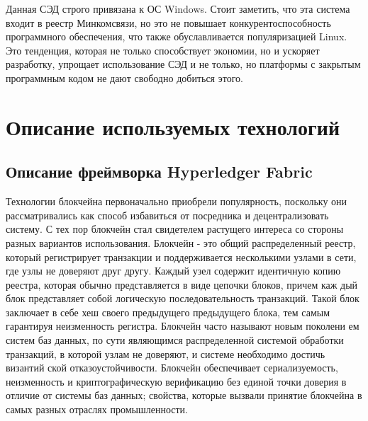 Данная СЭД строго привязана к ОС Windows. Стоит заметить, что эта система входит в реестр Минкомсвязи, но это не повышает конкурентоспособность программного обеспечения, что также обуславливается популяризацией Linux. Это тенденция, которая не только способствует экономии, но и ускоряет разработку, упрощает использование СЭД и не только, но платформы с закрытым программным кодом не дают свободно добиться этого. 


\section{Описание используемых технологий} \label{sec:ch1/sec3}

\subsection{Описание фреймворка Hyperledger Fabric} \label{subsec:ch1/sec3/subsec1}
Технологии блокчейна первоначально приобрели популярность, поскольку они рассматривались как способ избавиться от посредника и децентрализовать систему. С тех пор блокчейн стал свидетелем растущего интереса со стороны разных вариантов использования. Блокчейн - это общий распределенный реестр, который регистрирует транзакции и поддерживается несколькими узлами в сети, где узлы не доверяют друг другу. Каждый узел содержит идентичную копию реестра, которая обычно представляется в виде цепочки блоков, причем каж­ дый блок представляет собой логическую последовательность транзакций. Такой блок заключает в себе хеш своего предыдущего предыдущего блока, тем самым гарантируя неизменность регистра. Блокчейн часто называют новым поколени­ ем систем баз данных, по сути являющимся распределенной системой обработки транзакций, в которой узлам не доверяют, и системе необходимо достичь византий­ ской отказоустойчивости. Блокчейн обеспечивает сериализуемость, неизменность и криптографическую верификацию без единой точки доверия в отличие от систе­мы баз данных; свойства, которые вызвали принятие блокчейна в самых разных отраслях промышленности.


